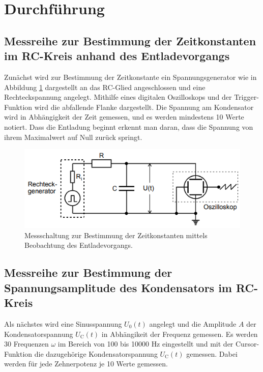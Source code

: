 \section{Durchführung}
\label{sec:Durchführung}

\subsection{Messreihe zur Bestimmung der Zeitkonstanten im RC-Kreis anhand des Entladevorgangs}

Zunächst wird zur Bestimmung der Zeitkonstante ein Spannungsgenerator
wie in Abbildung \ref{fig:v353_1} dargestellt an das RC-Glied angeschlossen und eine Rechteckspannung angelegt.
Mithilfe eines digitalen Oszilloskops und der Trigger-Funktion wird die abfallende 
Flanke dargestellt. Die Spannung am Kondensator wird in Abhängigkeit der Zeit gemessen, und es werden mindestens 10 Werte notiert.
Dass die Entladung beginnt erkennt man daran, dass die Spannung von ihrem Maximalwert auf Null zurück springt.
\begin{figure}[H]
  \centering
  \includegraphics{V353_1.png}
  \caption{Messschaltung zur Bestimmung der Zeitkonstanten mittels Beobachtung des 
  Entladevorgangs. \cite[S. 6]{kent}}
  \label{fig:v353_1}
\end{figure}

\subsection{Messreihe zur Bestimmung der Spannungsamplitude des Kondensators
im RC-Kreis}
Als nächstes wird eine Sinusspannung $U_\text{0}(t)$ angelegt und die 
Amplitude $A$ der Kondensatorspannung $U_\text{C}(t)$ in Abhängikeit der Frequenz gemessen.
Es werden 30 Frequenzen $\omega$ im Bereich von 100 bis 10000
$\si{\hertz}$ eingestellt und mit der Cursor-Funktion die dazugehörige Kondensatorspannung 
$U_\text{C}(t)$ gemessen. Dabei werden für jede Zehnerpotenz je 10 Werte gemessen.

